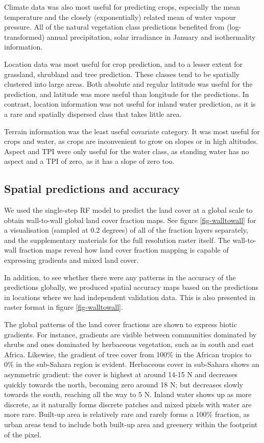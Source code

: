 \documentclass[review,authoryear,3p]{elsarticle}
\begin{document}
Climate data was also most useful for predicting crops, especially the mean temperature and the closely (exponentially) related mean of water vapour pressure.
All of the natural vegetation class predictions benefited from (log-transformed) annual precipitation, solar irradiance in January and isothermality information.

Location data was most useful for crop prediction, and to a lesser extent for grassland, shrubland and tree prediction.
These classes tend to be spatially clustered into large areas.
Both absolute and regular latitude was useful for the prediction, and latitude was more useful than longitude for the predictions.
In contrast, location information was not useful for inland water prediction, as it is a rare and spatially dispersed class that takes little area.

Terrain information was the least useful covariate category.
It was most useful for crops and water, as crops are inconvenient to grow on slopes or in high altitudes.
Aspect and \gls{TPI} were only useful for the water class, as standing water has no aspect and a \gls{TPI} of zero, as it has a slope of zero too.

\subsection{Spatial predictions and accuracy}

We used the single-step \gls{RF} model to predict the land cover at a global scale to obtain wall-to-wall global land cover fraction maps.
See figure \ref{fig-walltowall} for a visualisation (sampled at 0.2 degrees) of all of the fraction layers separately, and the supplementary materials for the full resolution raster itself.
The wall-to-wall fraction maps reveal how land cover fraction mapping is capable of expressing gradients and mixed land cover.

In addition, to see whether there were any patterns in the accuracy of the predictions globally, we produced spatial accuracy maps based on the predictions in locations where we had independent validation data.
This is also presented in raster format in figure \ref{fig-walltowall}.

The global patterns of the land cover fractions are shown to express biotic gradients.
For instance, gradients are visible between communities dominated by shrubs and ones dominated by herbaceous vegetation, such as in south and east Africa.
Likewise, the gradient of tree cover from 100\% in the African tropics to 0\% in the sub-Sahara region is evident.
Herbaceous cover in sub-Sahara shows an asymmetric gradient: the cover is highest at around 14-15\textdegree{} N and decreases quickly towards the north, becoming zero around 18\textdegree{} N; but decreases slowly towards the south, reaching all the way to 5\textdegree{} N.
Inland water shows up as more discrete, as it naturally forms discrete patches and mixed pixels with water are more rare.
Built-up area is relatively rare and rarely forms a 100\% fraction, as urban areas tend to include both built-up area and greenery within the footprint of the pixel.
\end{document}
